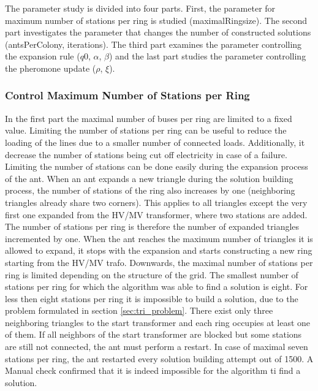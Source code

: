 The parameter study is divided into four parts. First, the parameter for maximum number of stations per ring is studied (maximalRingsize). The second part investigates the parameter that changes the number of constructed solutions (antsPerColony, iterations). The third part examines the parameter controlling the expansion rule ($q0$, $\alpha$, $\beta$) and the last part studies the parameter controlling the pheromone update ($\rho$, $\xi$).

\subsubsection{Control Maximum Number of Stations per Ring}\label{stations_per_ring}
In the first part the maximal number of buses per ring are limited to a fixed value. Limiting the number of stations per ring can be useful to reduce the loading of the lines due to a smaller number of connected loads. Additionally, it decrease the number of stations being cut off electricity in case of a failure. Limiting the number of stations can be done easily during the expansion process of the ant. When an ant expands a new triangle during the solution building process, the number of stations of the ring also increases by one (neighboring triangles already share two corners). This applies to all triangles except the very first one expanded from the HV/MV transformer, where two stations are added. The number of stations per ring is therefore the number of expanded triangles incremented by one. When the ant reaches the maximum number of triangles it is allowed to expand, it stops with the expansion and starts constructing a new ring starting from the HV/MV trafo. Downwards, the maximal number of stations per ring is limited depending on the structure of the grid. The smallest number of stations per ring for which the algorithm was able to find a solution is eight. For less then eight stations per ring it is impossible to build a solution, due to the problem formulated in section \ref{sec:tri_problem}. There exist only three neighboring triangles to the start transformer and each ring occupies at least one of them. If all neighbors of the start transformer are blocked but some stations are still not connected, the ant must perform a restart. In case of maximal seven stations per ring, the ant restarted every solution building attempt out of 1500. A Manual check confirmed that it is indeed impossible for the algorithm ti find a solution.

